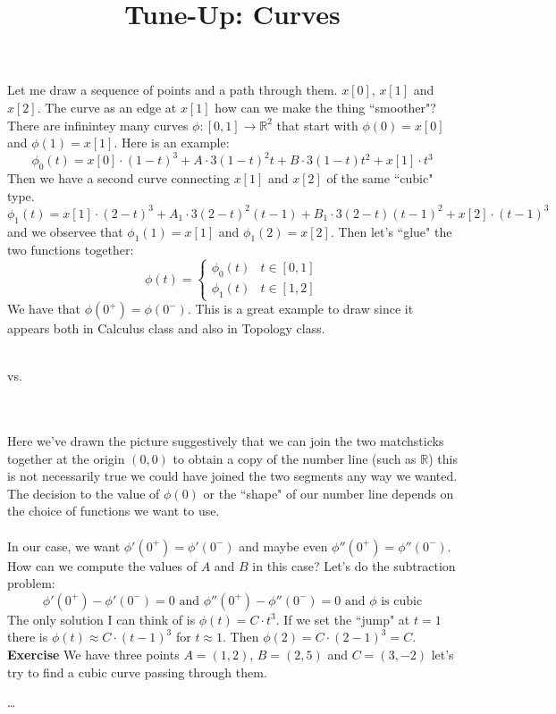 \documentclass[12pt]{article}
\title{Tune-Up: Curves}
\date{}
\begin{document}
\sffamily

\maketitle

\noindent Let me draw a sequence of points and a path through them. $x[0]$, $x[1]$ and $x[2]$. The curve as an edge at $x[1]$ how can we make the thing ``smoother"?  There are infinintey many curves $\phi:[0,1] \to \mathbb{R}^2$ that start with $\phi(0) = x[0]$ and $\phi(1) = x[1]$.  Here is an example:
$$ \phi_0(t) = x[0] \cdot (1-t)^3 + A \cdot 3(1-t)^2 t + B \cdot 3(1-t)t^2 + x[1] \cdot t^3 $$
Then we have a second curve connecting $x[1]$ and $x[2]$ of the same ``cubic" type.
$$ \phi_1(t) = x[1] \cdot (2-t)^3 + A_1 \cdot 3(2-t)^2(t-1) + B_1 \cdot 3(2-t)(t-1)^2 + x[2] \cdot (t-1)^3 $$
and we observee that $\phi_1(1) = x[1]$ and $\phi_1(2) = x[2]$.  Then let's ``glue" the two functions together:
$$ \phi(t) = \left\{ 
\begin{array}{cc} \phi_0(t) & t \in [0,1] \\
\phi_1(t) & t \in [1,2] \end{array}
\right. $$
We have that $\phi(0^+) = \phi(0^-)$.  This is a great example to draw since it appears both in Calculus class and also in Topology class. \\ \\
 vs. 
 \\ \\
Here we've drawn the picture suggestively that we can join the two matchsticks together at the origin $(0,0)$ to obtain a copy of the number line (such as $\mathbb{R}$) this is not necessarily true we could have joined the two segments any way we wanted.  The decision to the value of $\phi(0)$ or the ``shape" of our number line depends on the choice of functions we want to use.  \\ \\
In our case, we want $\phi'(0^+) = \phi'(0^-)$ and maybe even $\phi''(0^+) = \phi''(0^-)$.  How can we compute the values of $A$ and $B$ in this case?  Let's do the subtraction problem:
$$ \phi'(0^+) - \phi'(0^-) = 0 \text{ and }\phi''(0^+) - \phi''(0^-) = 0 \text{ and }\phi \text{ is cubic}$$
The only solution I can think of is $\phi(t) = C \cdot t^3$.  If we set the ``jump" at $t = 1$ there is $\phi(t) \approx C\cdot (t-1)^3$ for $t \approx 1$.  Then $\phi(2) = C\cdot (2-1)^3 = C$. 
\newpage \noindent \textbf{Exercise} We have three points $A = (1,2)$, $B = (2,5)$ and $C = (3,-2)$ let's try to find a cubic curve passing through them.  

\begin{thebibliography}{}

\item  \dots 

\end{thebibliography}
\end{document}
